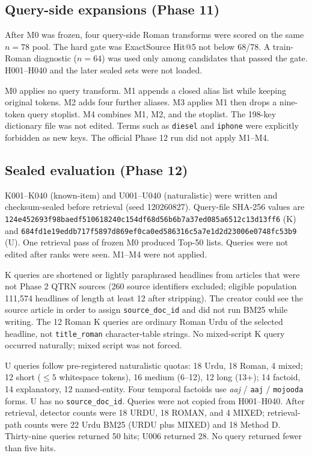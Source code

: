 \documentclass[10pt,letterpaper]{article}
\begin{document}
\subsection*{Query-side expansions (Phase 11)}

After M0 was frozen, four query-side Roman transforms were scored on the same $n = 78$ pool. The hard gate was ExactSource Hit@5 not below 68/78. A train-Roman diagnostic ($n = 64$) was used only among candidates that passed the gate. H001--H040 and the later sealed sets were not loaded.

M0 applies no query transform. M1 appends a closed alias list while keeping original tokens. M2 adds four further aliases. M3 applies M1 then drops a nine-token query stoplist. M4 combines M1, M2, and the stoplist. The 198-key dictionary file was not edited. Terms such as \texttt{diesel} and \texttt{iphone} were explicitly forbidden as new keys. The official Phase 12 run did not apply M1--M4.

\subsection*{Sealed evaluation (Phase 12)}

K001--K040 (known-item) and U001--U040 (naturalistic) were written and checksum-sealed before retrieval (seed 120260827). Query-file SHA-256 values are \texttt{124e452693f98baedf510618240c154df68d56b6b7a37ed085a6512c13d13ff6} (K) and \texttt{684fd1e19eddb717f5897d869ef0ca0ed586316c5a7e1d2d23006e0748fc53b9} (U). One retrieval pass of frozen M0 produced Top-50 lists. Queries were not edited after ranks were seen. M1--M4 were not applied.

K queries are shortened or lightly paraphrased headlines from articles that were not Phase 2 QTRN sources (260 source identifiers excluded; eligible population 111,574 headlines of length at least 12 after stripping). The creator could see the source article in order to assign \texttt{source\_doc\_id} and did not run BM25 while writing. The 12 Roman K queries are ordinary Roman Urdu of the selected headline, not \texttt{title\_roman} character-table strings. No mixed-script K query occurred naturally; mixed script was not forced.

U queries follow pre-registered naturalistic quotas: 18 Urdu, 18 Roman, 4 mixed; 12 short ($\leq 5$ whitespace tokens), 16 medium (6--12), 12 long (13+); 14 factoid, 14 explanatory, 12 named-entity. Four temporal factoids use \emph{aaj} / \texttt{aaj} / \texttt{mojooda} forms. U has no \texttt{source\_doc\_id}. Queries were not copied from H001--H040. After retrieval, detector counts were 18 URDU, 18 ROMAN, and 4 MIXED; retrieval-path counts were 22 Urdu BM25 (URDU plus MIXED) and 18 Method D. Thirty-nine queries returned 50 hits; U006 returned 28. No query returned fewer than five hits.
\end{document}
